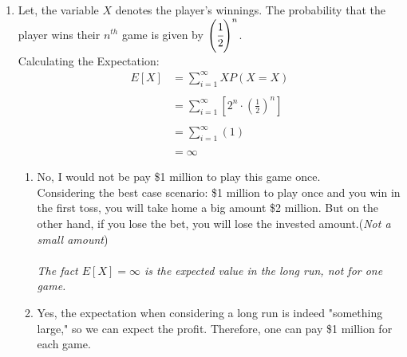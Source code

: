 \documentclass{article}
\begin{document}
\begin{enumerate}
\newpage
\item 
    Let, the variable \( X \) denotes the player's winnings. The probability that the player wins their \( n^{th} \) game is given by \( \left(\cfrac{1}{2}\right)^n \).\\
    Calculating the Expectation:
        \begin{align*}
        E [X] &= \sum_{i=1}^{\infty} X P(X = X) \\\\
            &= \sum_{i=1}^{\infty} \left[2^n\cdot \left(\frac{1}{2}\right)^n\right] \\\\
            &= \sum_{i=1}^{\infty} (1) \\\\
            &= \infty
        \end{align*}
        \begin{enumerate}
            \item 
            No, I would not be pay \$1 million to play this game once.\\
            Considering the best case scenario: \$1 million to play once and you win in the first toss, you will take home a big amount \$2 million. But on the other hand, if you lose the bet, you will lose the invested amount.(\textit{Not a small amount})\\\\
            \textit{The fact \( E[X] = \infty \) is the expected value in the long run, not for one game.}\\
            \item 
            Yes, the expectation when considering a long run is indeed "something large," so we can expect the profit. Therefore, one can pay \$1 million for each game.
        \end{enumerate}


\end{enumerate}
\end{document}
